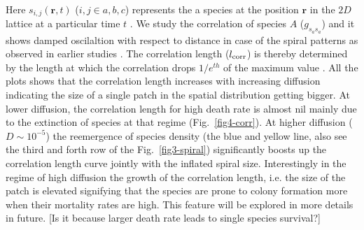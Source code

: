 \documentclass[aps, pre, twocolumn, amsmath, superscriptaddress,showkeys,showpacs]{revtex4-1}
\begin{document}
Here $s_{i,j}(\mathbf{r},t)$ ($i,j\in a,b,c$) represents the a species at the position $\mathbf{r}$ in the $2D$ lattice at a particular time $t$ \cite{reichenbach2007noise}. {\color{red}We study the correlation of species $A$ ($g_{s_a s_a}$) and it shows damped oscilaltion with respect to distance in case of the spiral patterns as observed in earlier studies \cite{reichenbach2007noise}.} The correlation length ($l_{\rm corr}$) is thereby determined by the length at which the correlation drops $1/e ^{th}$ of the maximum value \cite{reichenbach2008self}. {\color{red}All the plots shows that the correlation length increases with increasing diffusion indicating the size of a single patch in the spatial distribution getting bigger.} {\color{red}At lower diffusion, the correlation length for high death rate is almost nil mainly due to the extinction of species at that regime (Fig.\ \ref{fig4-corr}). At higher diffusion ($D\sim 10^{-5}$) the reemergence of species density (the blue and yellow line, also see the third and forth row of the Fig.\ \ref{fig3-spiral}) significantly boosts up the correlation length curve jointly with the inflated spiral size. %
Interestingly in the regime of high diffusion the growth of the correlation length, i.e. the size of the patch is elevated signifying that the species are prone to colony formation more when their mortality rates are high. This feature will be explored in more details in future.} {\color{blue}[Is it because larger death rate leads to single species survival?]}

	
\end{document}
